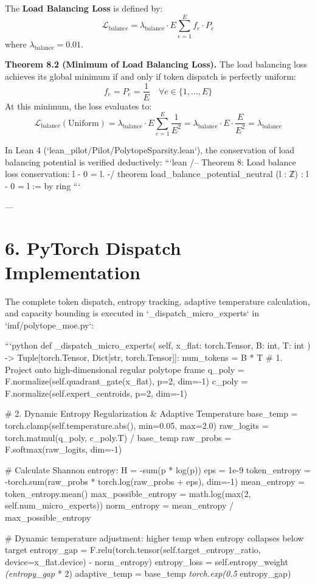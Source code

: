 \documentclass[11pt,twoside,openright]{amsbook}
\begin{document}
{{{{{{{{{{The \textbf{Load Balancing Loss} is defined by:
$$\mathcal{L}_{\text{balance}} = \lambda_{\text{balance}} \cdot E \sum_{e=1}^E f_e \cdot P_e$$
where $\lambda_{\text{balance}} = 0.01$.

\textbf{Theorem 8.2 (Minimum of Load Balancing Loss).} The load balancing loss achieves its global minimum if and only if token dispatch is perfectly uniform:
$$f_e = P_e = \frac{1}{E} \quad \forall e \in \{1, \dots, E\}$$
At this minimum, the loss evaluates to:
$$\mathcal{L}_{\text{balance}}(\text{Uniform}) = \lambda_{\text{balance}} \cdot E \sum_{e=1}^E \frac{1}{E^2} = \lambda_{\text{balance}} \cdot E \cdot \frac{E}{E^2} = \lambda_{\text{balance}}$$

In Lean 4 (`lean_pilot/Pilot/PolytopeSparsity.lean`), the conservation of load balancing potential is verified deductively:
```lean
/-- Theorem 8: Load balance loss conservation: l - 0 = l. -/
theorem load_balance_potential_neutral (l : ℤ) :
    l - 0 = l := by
  ring
```

---

\section{6. PyTorch Dispatch Implementation}

The complete token dispatch, entropy tracking, adaptive temperature calculation, and capacity bounding is executed in `_dispatch_micro_experts` in `imf/polytope_moe.py`:

```python
def _dispatch_micro_experts(
    self, x_flat: torch.Tensor, B: int, T: int
) -> Tuple[torch.Tensor, Dict[str, torch.Tensor]]:
    num_tokens = B * T
    # 1. Project onto high-dimensional regular polytope frame
    q_poly = F.normalize(self.quadrant_gate(x_flat), p=2, dim=-1)
    c_poly = F.normalize(self.expert_centroids, p=2, dim=-1)

    # 2. Dynamic Entropy Regularization & Adaptive Temperature
    base_temp = torch.clamp(self.temperature.abs(), min=0.05, max=2.0)
    raw_logits = torch.matmul(q_poly, c_poly.T) / base_temp
    raw_probs = F.softmax(raw_logits, dim=-1)

    # Calculate Shannon entropy: H = -sum(p * log(p))
    eps = 1e-9
    token_entropy = -torch.sum(raw_probs * torch.log(raw_probs + eps), dim=-1)
    mean_entropy = token_entropy.mean()
    max_possible_entropy = math.log(max(2, self.num_micro_experts))
    norm_entropy = mean_entropy / max_possible_entropy

    # Dynamic temperature adjustment: higher temp when entropy collapses below target
    entropy_gap = F.relu(torch.tensor(self.target_entropy_ratio, device=x_flat.device) - norm_entropy)
    entropy_loss = self.entropy_weight \textit{ (entropy_gap }* 2)
    adaptive_temp = base_temp \textit{ torch.exp(0.5 } entropy_gap)

}}}}}}}}}}
\end{document}
